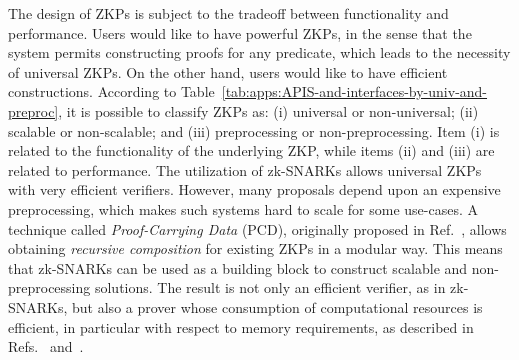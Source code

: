 	The design of ZKPs is subject to the tradeoff between functionality and performance. 
	Users would like to have powerful ZKPs, in the sense that the system permits constructing %
proofs for any predicate, which %
leads to the necessity of universal ZKPs. 
	On the other hand, users would like to have efficient constructions. 
	According to Table~\ref{tab:apps:APIS-and-interfaces-by-univ-and-preproc}, it is possible to classify ZKPs as:
(i) universal or non-universal;
(ii) scalable or non-scalable; and 
(iii) preprocessing or non-preprocessing. 
	Item (i) is related to the functionality of the underlying %
ZKP, while items (ii) and (iii) are related to performance. 
	The utilization of zk-SNARKs allows %
universal ZKPs with very efficient verifiers. 
	However, many proposals %
depend upon an expensive preprocessing, which makes such systems hard to scale for some use-cases. 
	A technique called \textit{Proof-Carrying Data} (PCD), originally proposed in Ref.~\cite{2010:ICS:proof-carrying-data}, 
allows obtaining %
\textit{recursive composition} for existing ZKPs in a modular way. %
	This means that zk-SNARKs can be used as a building block to construct scalable and non-preprocessing solutions.
	The result is not only an efficient verifier, as in zk-SNARKs, but also a prover whose consumption of computational resources is efficient, in particular with respect to memory requirements, as described in Refs.~\cite{2017:Alg:Scalable-Zero-Knowledge-Via-Cycles-of-Elliptic-Curves} and~\cite{2013:Recursive-Composition-and-Bootstrapping-for-SNARKS-and-Proof-carrying-Data}.
\loosen







